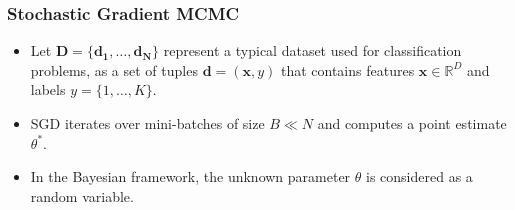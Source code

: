 \documentclass[10pt,a4paper]{beamer}
\begin{document}
\begin{frame}\frametitle{Stochastic Gradient MCMC}
\begin{itemize}
	\item Let $\mathbf{D}=\{\mathbf{d_1},\ldots,\mathbf{d_N}\}$ represent a typical dataset used for classification problems, as a set of tuples $\mathbf{d}=(\mathbf x,y)$ that contains features $\mathbf x \in \mathbb R^D$ and labels $y=\{1,\ldots,K\}$. 
	\pause
	\item  SGD iterates  over mini-batches of size $B \ll N$ and computes a point estimate $\theta^\ast$. 
	\pause
	\item In the Bayesian framework, the unknown parameter $\theta$ is considered as a random variable.
\end{itemize}
\pause
{}
\end{frame}
\end{document}
